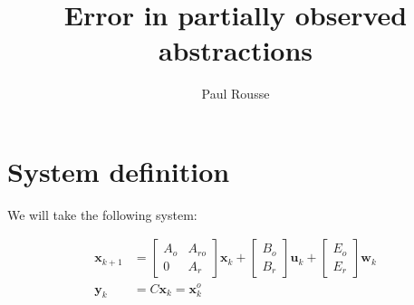 \documentclass{article}
\begin{document}
\title{Error in partially observed abstractions}
\author{Paul Rousse}
\maketitle



\newcommand{\mle}{\prec}
\newcommand{\mleq}{\preceq}
\newcommand{\minf}[1]{\underline{#1}}
\newcommand{\msup}[1]{\overline{#1}}

\newcommand{\vect}[1]{\mathbf{#1}}

\newcommand{\x}{\vect{x}}%
\renewcommand{\u}{\vect{u}}%
\newcommand{\w}{\vect{w}}%

\newcommand{\y}{\vect{y}}%
\newcommand{\yk}{\vect{y}_k}%
\newcommand{\ykn}{\vect{y}_{k+1}}%

\newcommand{\xk}{\vect{x}_k}%
\newcommand{\xkn}{\vect{x}_{k+1}}%

\newcommand{\uk}{\vect{u}_k}%
\newcommand{\wk}{\vect{w}_k}%

\newcommand{\xo}{\vect{x}^o}%
\newcommand{\xr}{\vect{x}^r}%

\newcommand{\Ao}{A_o}%
\newcommand{\Ar}{A_r}%
\newcommand{\Aro}{A_{ro}}%

\newcommand{\Bo}{B_o}%
\newcommand{\Br}{B_r}%

\newcommand{\Eo}{E_o}%
\newcommand{\Er}{E_r}%

\newcommand{\Xr}{X_r}%

\newcommand{\Xrinv}{\mathcal{X}_r}%
\newcommand{\xrinf}{\minf{\x}_r}%
\newcommand{\xrsup}{\msup{\x}_r}%


\newcommand{\Wsup}{\msup{W}}
\newcommand{\Winf}{\minf{W}}
\newcommand{\Wk}{W_k}

\renewcommand{\wr}{\vect{w}^r}
\newcommand{\Wrsup}{\msup{W}^r}
\newcommand{\Wrinf}{\minf{W}^r}
\newcommand{\Wrk}{W^r_k}

\newcommand{\traj}{\varphi}

\section{System definition}
We will take the following system:

\begin{equation}
\begin{aligned}
\xkn &=
\begin{bmatrix} \Ao&\Aro\\ 0& \Ar \end{bmatrix} \xk + 
\begin{bmatrix} \Bo\\ \Br \end{bmatrix} \uk + 
\begin{bmatrix} \Eo\\ \Er \end{bmatrix} \wk
\\
\yk &= C\xk = \xo_k
\end{aligned}
\end{equation}
\end{document}
